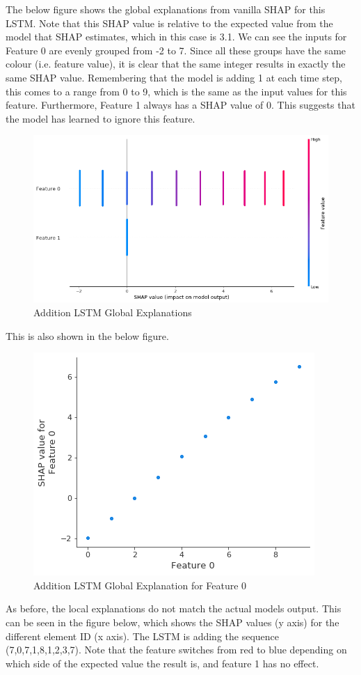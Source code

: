 \documentclass[12pt]{article}
\begin{document}
The below figure shows the global explanations from vanilla SHAP for this LSTM. Note that this SHAP value is relative to the expected value from the model that SHAP estimates, which in this case is 3.1. We can see the inputs for Feature 0 are evenly grouped from -2 to 7. 
Since all these groups have the same colour (i.e. feature value), it is clear that the same integer results in exactly the same SHAP value. Remembering that the model is adding 1 at each time step, this comes to a range from 0 to 9, which is the same as the input values for this feature. Furthermore, Feature 1 always has a SHAP value of 0. This suggests that the model has learned to ignore this feature.

\begin{figure}[H]
\centering\caption{Addition LSTM Global Explanations}
\includegraphics[scale=0.4]{Sanity Old Global.png}
\end{figure}
This is also shown in the below figure. 

\begin{figure}[H]
\centering\caption{Addition LSTM Global Explanation for Feature 0}
\includegraphics[scale=0.5]{Sanity Old Global Feature.png}
\end{figure}
As before, the local explanations do not match the actual models output. This can be seen in the figure below, which shows the SHAP values (y axis) for the different element ID (x axis). The LSTM is adding the sequence (7,0,7,1,8,1,2,3,7). Note that the feature switches from red to blue depending on which side of the expected value the result is, and feature 1 has no effect. 
\end{document}

